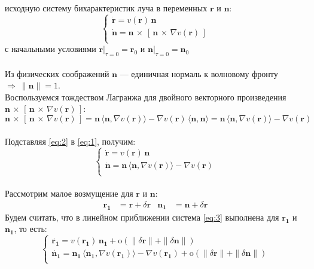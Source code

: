\documentclass{article}
\newcommand{\bfv}[1]{\mathbf{#1}}
\newcommand{\dd}[1]{\dot{#1}}
\newcommand{\dvp}[3]{#1\,\times\,[\,#2\,\times\,#3\,]}
\newcommand{\dv}[1]{\nabla v(#1)}
\newcommand{\dr}{\delta \bfv{r}}
\newcommand{\dn}{\delta \bfv{n}}
\newcommand{\om}[1]{\mathrm{o}(#1)}
\newcommand{\dprod}[2]{\langle #1, #2 \rangle}
\begin{document}
 исходную систему бихарактеристик луча в переменных $\bfv{r}$ и $\bfv{n}$:
\begin{equation} \label{eq:1}
\begin{cases}
\dd{\bfv{r}} = v(\bfv{r})\,\bfv{n}\\
\dd{\bfv{n}} = \dvp{\bfv{n}}{\bfv{n}}{\dv{\bfv{r}}}\\
\end{cases}
\end{equation}
с начальными условиями $\bfv{r}|_{\tau=0} = \bfv{r}_0$ и $\bfv{n}|_{\tau=0} = \bfv{n}_0$\\\\
Из физических соображений $\bfv{n}$ --- единичная нормаль к волновому фронту $\Rightarrow \ \|\bfv{n}\| = 1$.\\ 
Воспользуемся тождеством Лагранжа для двойного векторного произведения $\dvp{\bfv{n}}{\bfv{n}}{\dv{\bfv{r}}}$:
\begin{equation} \label{eq:2}
    \dvp{\bfv{n}}{\bfv{n}}{\dv{\bfv{r}}} = \bfv{n}\,\dprod{\bfv{n}}{\dv{\bfv{r}}} - \dv{\bfv{r}}\,\dprod{\bfv{n}}{\bfv{n}} = \bfv{n}\,\dprod{\bfv{n}}{\dv{\bfv{r}}} - \dv{\bfv{r}}
\end{equation}\\
Подставляя \eqref{eq:2} в \eqref{eq:1}, получим:\\
\begin{equation} \label{eq:3}
\begin{cases}
\dd{\bfv{r}} = v(\bfv{r})\,\bfv{n}\\
\dd{\bfv{n}} =  \bfv{n}\,\dprod{\bfv{n}}{\dv{\bfv{r}}} - \dv{\bfv{r}}\\
\end{cases}
\end{equation}\\
Рассмотрим малое возмущение для $\bfv{r}$ и $\bfv{n}$:
\begin{align*}
\bfv{r_1} &= \bfv{r} + \dr   &   \bfv{n_1} &= \bfv{n} + \dr
\end{align*}
Будем считать, что в линейном приближении система \eqref{eq:3} выполнена для $\bfv{r_1}$ и $\bfv{n_1}$, то есть:\\
\begin{equation} \label{eq4}
\begin{cases}
\dd{\bfv{r_1}} = v(\bfv{r_1})\,\bfv{n_1} + \om{\|\dr\| + \|\dn\|}\\
\dd{\bfv{n_1}} = \bfv{n_1}\,\dprod{\bfv{n_1}}{\dv{\bfv{r_1}}} - \dv{\bfv{r_1}} + \om{\|\dr\| + \|\dn\|}\\
\end{cases}
\end{equation}\\
\end{document}
